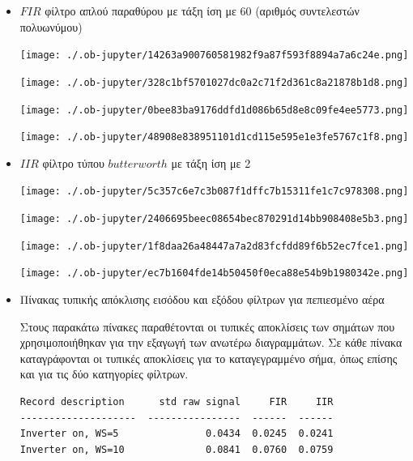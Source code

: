 \documentclass[breaklines=true, 12pt]{article}
\begin{document}
\begin{itemize}
\begin{itemize}
\item \(FIR\) φίλτρο απλού παραθύρου με τάξη ίση με 60 (αριθμός συντελεστών πολυωνύμου)
\begin{center}
\texttt{[image: ./.ob-jupyter/14263a900760581982f9a87f593f8894a7a6c24e.png]}
\end{center}
\begin{center}
\texttt{[image: ./.ob-jupyter/328c1bf5701027dc0a2c71f2d361c8a21878b1d8.png]}
\end{center}
\begin{center}
\texttt{[image: ./.ob-jupyter/0bee83ba9176ddfd1d086b65d8e8c09fe4ee5773.png]}
\end{center}
\begin{center}
\texttt{[image: ./.ob-jupyter/48908e838951101d1cd115e595e1e3fe5767c1f8.png]}
\end{center}
\end{itemize}

\clearpage
\begin{itemize}
\item \(IIR\) φίλτρο τύπου \(butterworth\) με τάξη ίση με 2
\begin{center}
\texttt{[image: ./.ob-jupyter/5c357c6e7c3b087f1dffc7b15311fe1c7c978308.png]}
\end{center}
\begin{center}
\texttt{[image: ./.ob-jupyter/2406695beec08654bec870291d14bb908408e5b3.png]}
\end{center}
\begin{center}
\texttt{[image: ./.ob-jupyter/1f8daa26a48447a7a2d83fcfdd89f6b52ec7fce1.png]}
\end{center}
\begin{center}
\texttt{[image: ./.ob-jupyter/ec7b1604fde14b50450f0eca88e54b9b1980342e.png]}
\end{center}
\end{itemize}
\end{itemize}


\begin{itemize}
\item Πίνακας τυπικής απόκλισης εισόδου και εξόδου φίλτρων για πεπιεσμένο αέρα

Στους παρακάτω πίνακες παραθέτονται οι τυπικές αποκλίσεις των σημάτων
που χρησιμοποιήθηκαν για την εξαγωγή των ανωτέρω διαγραμμάτων. Σε κάθε
πίνακα καταγράφονται οι τυπικές αποκλίσεις για το καταγεγραμμένο σήμα,
όπως επίσης και για τις δύο κατηγορίες φίλτρων.

\begin{verbatim}
Record description      std raw signal     FIR     IIR
--------------------  ----------------  ------  ------
Inverter on, WS=5               0.0434  0.0245  0.0241
Inverter on, WS=10              0.0841  0.0760  0.0759
\end{verbatim}
\end{itemize}
\end{document}
